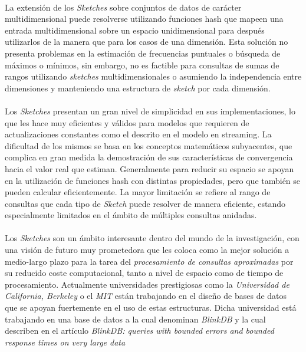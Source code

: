\documentclass{subfiles}
\begin{document}
        \paragraph{}
        La extensión de los \emph{Sketches} sobre conjuntos de datos de carácter multidimensional puede resolverse utilizando funciones hash que mapeen una entrada multidimensional sobre un espacio unidimensional para después utilizarlos de la manera que para los casos de una dimensión. Esta solución no presenta problemas en la estimación de frecuencias puntuales o búsqueda de máximos o mínimos, sin embargo, no es factible para consultas de sumas de rangos utilizando \emph{sketches} multidimensionales o asumiendo la independencia entre dimensiones y manteniendo una estructura de \emph{sketch} por cada dimensión.

        \paragraph{}
        Los \emph{Sketches} presentan un gran nivel de simplicidad en sus implementaciones, lo que les hace muy eficientes y válidos para modelos que requieren de actualizaciones constantes como el descrito en el modelo en streaming. La dificultad de los mismos se basa en los conceptos matemáticos subyacentes, que complica en gran medida la demostración de sus características de convergencia hacia el valor real que estiman. Generalmente para reducir su espacio se apoyan en la utilización de funciones hash con distintas propiedades, pero que también se pueden calcular eficientemente. La mayor limitación se refiere al rango de consultas que cada tipo de \emph{Sketch} puede resolver de manera eficiente, estando especialmente limitados en el ámbito de múltiples consultas anidadas.

        \paragraph{}
        Los \emph{Sketches} son un ámbito interesante dentro del mundo de la investigación, con una visión de futuro muy prometedora que les coloca como la mejor solución a medio-largo plazo para la tarea del \emph{procesamiento de consultas aproximadas} por su reducido coste computacional, tanto a nivel de espacio como de tiempo de procesamiento. Actualmente universidades prestigiosas como la \emph{Universidad de California, Berkeley} o el \emph{MIT} están trabajando en el diseño de bases de datos que se apoyan fuertemente en el uso de estas estructuras. Dicha universidad está trabajando en una base de datos a la cual denominan \emph{BlinkDB} y la cual describen en el artículo \emph{BlinkDB: queries with bounded errors and bounded response times on very large data} \cite{agarwal2013blinkdb}
\end{document}
